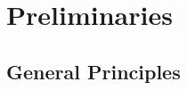 
\chapter{Preliminaries}
\label{chapter:preliminaries}

\section{General Principles}
\label{sec:general-principles}







